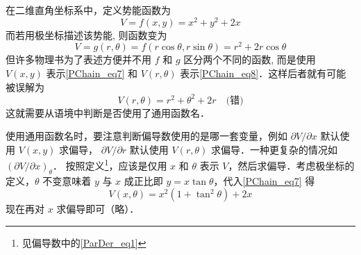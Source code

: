 \begin{exam}{}\label{PChain_ex1}
在二维直角坐标系中，定义势能函数为
\begin{equation}\label{PChain_eq7}
V=f(x,y)=x^2+y^2+2x
\end{equation}
而若用极坐标描述该势能, 则函数变为
\begin{equation}\label{PChain_eq8}
V = g(r,\theta) = f(r\cos \theta ,r\sin \theta ) = {r^2} + 2r\cos \theta
\end{equation}
但许多物理书为了表述方便并不用 $f$ 和 $g$ 区分两个不同的函数, 而是使用 $V(x,y)$ 表示\autoref{PChain_eq7} 和 $V(r,\theta)$ 表示\autoref{PChain_eq8}．这样后者就有可能被误解为
\begin{equation}
V(r,\theta) = r^2+\theta^2+2r \quad \text{(错)}
\end{equation}
这就需要从语境中判断是否使用了通用函数名．

使用通用函数名时，要注意判断偏导数使用的是哪一套变量，例如 $\partial V/\partial x$ 默认使用 $V(x,y)$ 求偏导， $\partial V/\partial r$ 默认使用 $V(r,\theta)$ 求偏导．一种更复杂的情况如 $\left(\partial V/\partial x\right)_\theta$． 按照定义\footnote{见偏导数中的\autoref{ParDer_eq1}}，应该是仅用 $x$ 和 $\theta$ 表示 $V$，然后求偏导．考虑极坐标的定义，$\theta$ 不变意味着 $y$ 与 $x$ 成正比即 $y=x\tan\theta$，代入\autoref{PChain_eq7} 得
\begin{equation}
V(x,\theta)=x^2(1+\tan^2 \theta) + 2x
\end{equation}
现在再对 $x$ 求偏导即可（略）．
\end{exam}
